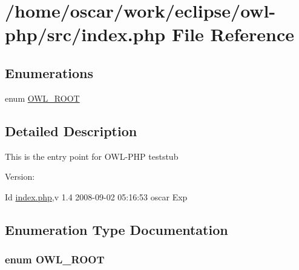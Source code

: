 \hypertarget{index_8php}{
\section{/home/oscar/work/eclipse/owl-php/src/index.php File Reference}
\label{index_8php}
}
\subsection*{Enumerations}
\begin{CompactItemize}
\item 
enum \hyperlink{index_8php_35612f9a6bd7277982731a74593272c4}{OWL\_\-ROOT} 
\end{CompactItemize}


\subsection{Detailed Description}
This is the entry point for OWL-PHP teststub \begin{Desc}
\item[Version:]\end{Desc}
\begin{Desc}
\item[Id]\hyperlink{index_8php}{index.php},v 1.4 2008-09-02 05:16:53 oscar Exp \end{Desc}


\subsection{Enumeration Type Documentation}
\hypertarget{index_8php_35612f9a6bd7277982731a74593272c4}{
\subsubsection{\setlength{\rightskip}{0pt plus 5cm}enum {\bf OWL\_\-ROOT}}}
\label{index_8php_35612f9a6bd7277982731a74593272c4}


